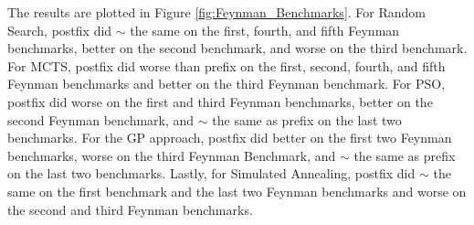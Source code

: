 \documentclass[runningheads]{llncs}
\begin{document}
\par The results are plotted in Figure \ref{fig:Feynman_Benchmarks}. For Random Search, postfix did $\sim$ the same on the first, fourth, and fifth Feynman benchmarks, better on the second benchmark, and worse on the third benchmark. For MCTS, postfix did worse than prefix on the first, second, fourth, and fifth Feynman benchmarks and better on the third Feynman benchmark. For PSO, postfix did worse on the first and third Feynman benchmarks, better on the second Feynman benchmark, and $\sim$ the same as prefix on the last two benchmarks. For the GP approach, postfix did better on the first two Feynman benchmarks, worse on the third Feynman Benchmark, and $\sim$ the same as prefix on the last two benchmarks. Lastly, for Simulated Annealing, postfix did $\sim$ the same on the first benchmark and the last two Feynman benchmarks and worse on the second and third Feynman benchmarks.
\end{document}
